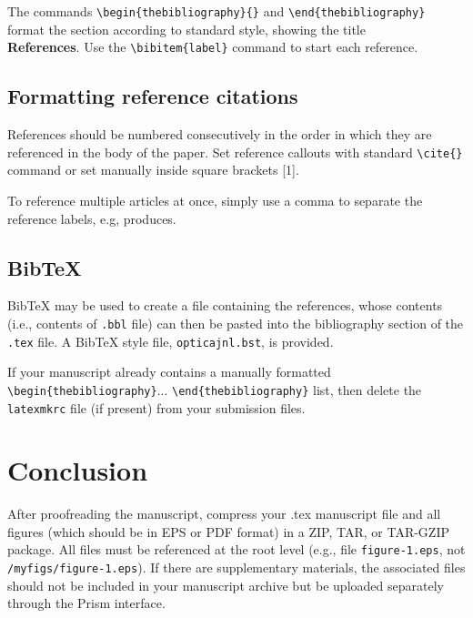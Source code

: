 \documentclass{optica-article}
\begin{document}
The commands \verb+\begin{thebibliography}{}+ and \verb+\end{thebibliography}+ format the section according to standard style, showing the title\\
{\bfseries References}.  Use the \verb+\bibitem{label}+ command to start each reference.

\subsection{Formatting reference citations}
References should be numbered consecutively in the order in which they are referenced in the body of the paper. Set reference callouts with standard \verb+\cite{}+ command or set manually inside square brackets [1].

To reference multiple articles at once, simply use a comma to separate the reference labels, e.g, produces.

\subsection{Bib\TeX}
\label{sec:bibtex}
Bib\TeX{} may be used to create a file containing the references, whose contents (i.e., contents of \texttt{.bbl} file) can then be pasted into the bibliography section of the \texttt{.tex} file. A Bib\TeX{} style file, \texttt{opticajnl.bst}, is provided.

If your manuscript already contains a manually formatted \verb|\begin{thebibliography}|... \verb|\end{thebibliography}| list, then delete the \texttt{latexmkrc} file (if present) from your submission files. 

\section{Conclusion}
After proofreading the manuscript, compress your .tex manuscript file and all figures (which should be in EPS or PDF format) in a ZIP, TAR, or TAR-GZIP package. All files must be referenced at the root level (e.g., file \texttt{figure-1.eps}, not \texttt{/myfigs/figure-1.eps}). If there are supplementary materials, the associated files should not be included in your manuscript archive but be uploaded separately through the Prism interface.

\end{document}
